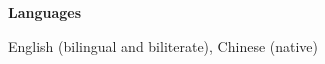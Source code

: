\documentclass[11pt]{article}
\begin{document}
\begin{minipage}[t]{0.18\textwidth}
{\bf Languages}
\end{minipage}
\begin{minipage}[t]{0.8\textwidth}
English (bilingual and biliterate), Chinese (native)
\end{minipage} %



\end{document}
